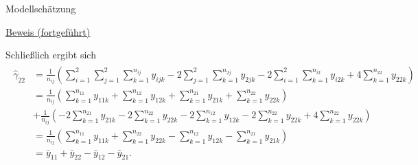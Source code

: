 \documentclass[
  8pt,
  ignorenonframetext,
]{beamer}
\begin{document}
\begin{frame}{Modellschätzung}
\protect\hypertarget{modellschuxe4tzung-13}{}
\footnotesize

\underline{Beweis (fortgeführt)}

Schließlich ergibt sich \tiny \begin{align}
\begin{split}
\hat{\gamma}_{22}
& =
\frac{1}{n_{ij}}
\left(
   \sum_{i=1}^2 \sum_{j=1}^2 \sum_{k = 1}^{n_{ij}} y_{ijk}
- 2\sum_{j=1}^2 \sum_{k = 1}^{n_{2j}} y_{2jk}
- 2\sum_{i=1}^2 \sum_{k = 1}^{n_{i2}} y_{i2k}
+ 4 \sum_{k = 1}^{n_{22}} y_{22k}
\right)
\\
& =
\frac{1}{n_{ij}}
\left(\sum_{k = 1}^{n_{11}} y_{11k} + \sum_{k = 1}^{n_{12}} y_{12k} + \sum_{k = 1}^{n_{21}} y_{21k} + \sum_{k = 1}^{n_{22}} y_{22k}\right)
\\
&
+ \frac{1}{n_{ij}}
\left(
  - 2\sum_{k = 1}^{n_{21}} y_{21k} - 2\sum_{k = 1}^{n_{22}} y_{22k}
  - 2\sum_{k = 1}^{n_{12}} y_{12k} - 2\sum_{k = 1}^{n_{22}} y_{22k}
  + 4\sum_{k = 1}^{n_{22}} y_{22k}
\right)
\\
& =
\frac{1}{n_{ij}}
\left(
  \sum_{k = 1}^{n_{11}} y_{11k}
+ \sum_{k = 1}^{n_{22}} y_{22k}
- \sum_{k = 1}^{n_{12}} y_{12k}
- \sum_{k = 1}^{n_{21}} y_{21k}
\right)
\\
& = \bar{y}_{11} + \bar{y}_{22} - \bar{y}_{12} - \bar{y}_{21}.
\end{split}
\end{align}
\end{frame}
\end{document}
